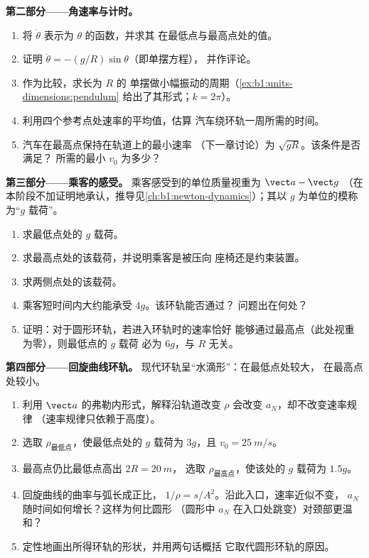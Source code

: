 \begin{problem}
\medskip
\noindent\textbf{第二部分——角速率与计时。}
\begin{enumerate}[resume]
  \item 将 $\dot\theta$ 表示为 $\theta$ 的函数，并求其
        在最低点与最高点处的值。
  \item 证明 $\ddot\theta = -(g/R)\sin\theta$（即单摆方程），
        并作评论。
  \item 作为比较，求长为 $R$ 的
        单摆做小幅振动的周期（\cref{ex:b1:units-dimensions:pendulum}
        给出了其形式；$k = 2\pi$）。
  \item 利用四个参考点处速率的平均值，估算
        汽车绕环轨一周所需的时间。
  \item 汽车在最高点保持在轨道上的最小速率
        （下一章讨论）为 $\sqrt{gR}$。该条件是否满足？
        所需的最小 $v_0$ 为多少？
\end{enumerate}

\medskip
\noindent\textbf{第三部分——乘客的感受。}
乘客感受到的单位质量视重为 $\vect a - \vect g$
（在本阶段不加证明地承认，推导见\cref{ch:b1:newton-dynamics}）；其以
$g$ 为单位的模称为“$g$ 载荷”。
\begin{enumerate}[resume]
  \item 求最低点处的 $g$ 载荷。
  \item 求最高点处的该载荷，并说明乘客是被压向
        座椅还是约束装置。
  \item 求两侧点处的该载荷。
  \item 乘客短时间内大约能承受 $4g$。该环轨能否通过？
        问题出在何处？
  \item 证明：对于圆形环轨，若进入环轨时的速率恰好
        能够通过最高点（此处视重为零），则最低点的 $g$ 载荷
        必为 $6g$，与 $R$ 无关。
\end{enumerate}

\medskip
\noindent\textbf{第四部分——回旋曲线环轨。}
现代环轨呈“水滴形”：在最低点处较大，
在最高点处较小。
\begin{enumerate}[resume]
  \item 利用 $\vect a$ 的弗勒内形式，解释沿轨道改变
        $\rho$ 会改变 $a_N$，却不改变速率规律
        （速率规律只依赖于高度）。
  \item 选取 $\rho_{\text{最低点}}$，使最低点处的 $g$ 载荷为
        $3g$，且 $v_0 = \qty{25}{m/s}$。
  \item 最高点仍比最低点高出 $2R = \qty{20}{m}$，
        选取 $\rho_{\text{最高点}}$，使该处的 $g$ 载荷为
        $1.5g$。
  \item 回旋曲线的曲率与弧长成正比，
        $1/\rho = s/A^2$。沿此入口，速率近似不变，
        $a_N$ 随时间如何增长？这样为何比圆形
        （圆形中 $a_N$ 在入口处跳变）对颈部更温和？
  \item 定性地画出所得环轨的形状，并用两句话概括
        它取代圆形环轨的原因。
\end{enumerate}


\end{problem}

